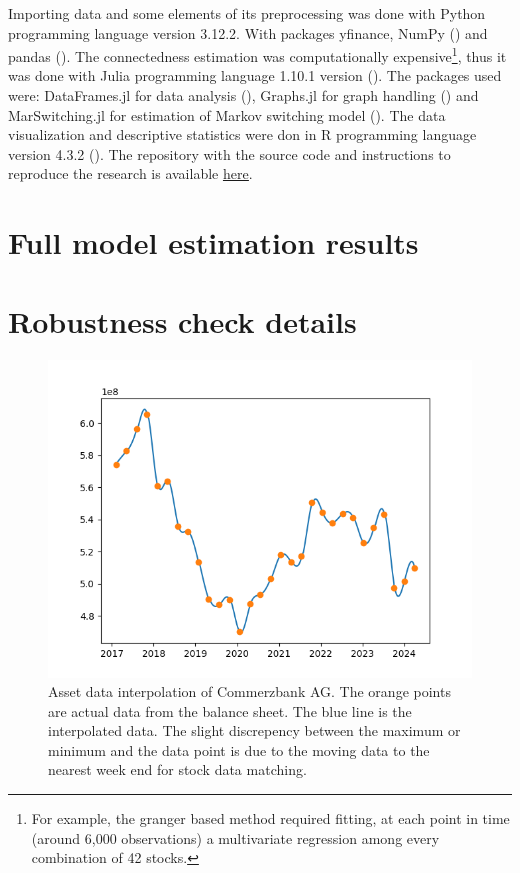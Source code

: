 \documentclass[12pt]{article}
\begin{document}
Importing data and some elements of its preprocessing was done with Python programming language version 3.12.2. With packages yfinance, NumPy (\citet{harris20}) and pandas (\citet{reback20}). The connectedness estimation was computationally expensive\footnote{For example, the granger based method required fitting, at each point in time (around 6,000 observations) a multivariate regression among every combination of 42 stocks.}, thus it was done with Julia programming language 1.10.1 version (\citet{bezanson17}). The packages used were: DataFrames.jl for data analysis (\citet{kaminski23}), Graphs.jl for graph handling (\citet{fairbanks21}) and MarSwitching.jl for estimation of Markov switching model (\citet{dadej24}). The data visualization and descriptive statistics were don in R programming language version 4.3.2 (\citet{rcore23}). The repository with the source code and instructions to reproduce the research is available \href{https://github.com/m-dadej/robust\_fragile}{\underline{here}}.

\section{Full model estimation results}\label{appendix:model_params}

\section{Robustness check details}\label{appendix:robustness}

\begin{figure}[!htbp]
	\centering
	\includegraphics[scale = 0.8]{img/interpolation.png}
	\caption{Asset data interpolation of Commerzbank AG. The orange points are actual data from the balance sheet. The blue line is the interpolated data. The slight discrepency between the maximum or minimum and the data point is due to the moving data to the nearest week end for stock data matching.}
	\label{figure:interpolation}
\end{figure}
\end{document}
